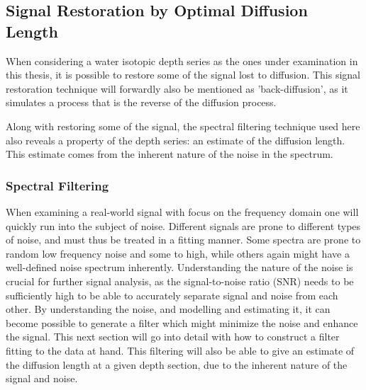 \documentclass[../../CompleteThesis2/Complete_2ndDraft]{subfiles}
\begin{document}
\subsection[Signal Restoration][Signal Restoration]{Signal Restoration by Optimal Diffusion Length}
\label{Subsec:SignalAnalysis_BackDiffusion_SignalRestoration}
When considering a water isotopic depth series as the ones under examination in this thesis, it is possible to restore some of the signal lost to diffusion. This signal restoration technique will forwardly also be mentioned as 'back-diffusion', as it simulates a process that is the reverse of the diffusion process.

Along with restoring some of the signal, the spectral filtering technique used here also reveals a property of the depth series: an estimate of the diffusion length. This estimate comes from the inherent nature of the noise in the spectrum.

\subsubsection[Spectral Filtering][Spectral Filtering]{Spectral Filtering}
\label{Subsubsec:SignalAnalysis_BackDiffusion_SpectralFiltering}


When examining a real-world signal with focus on the frequency domain one will quickly run into the subject of noise. Different signals are prone to different types of noise, and must thus be treated in a fitting manner. Some spectra are prone to random low frequency noise and some to high, while others again might have a well-defined noise spectrum inherently. Understanding the nature of the noise is crucial for further signal analysis, as the signal-to-noise ratio (SNR) needs to be sufficiently high to be able to accurately separate signal and noise from each other. By understanding the noise, and modelling and estimating it, it can become possible to generate a filter which might minimize the noise and enhance the signal. This next section will go into detail with how to construct a filter fitting to the data at hand. This filtering will also be able to give an estimate of the diffusion length at a given depth section, due to the inherent nature of the signal and noise.

%
\end{document}
